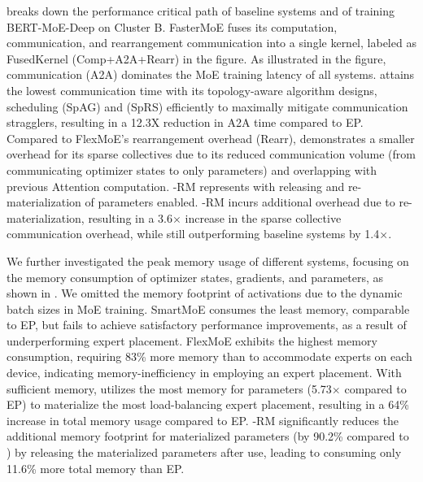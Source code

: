 

 breaks down the performance critical path of baseline systems and \xxx of training BERT-MoE-Deep on Cluster B.
FasterMoE fuses its computation, \collatoa communication, and rearrangement communication into a single kernel, labeled as FusedKernel (Comp+A2A+Rearr) in the figure.
As illustrated in the figure, \collatoa communication (A2A) dominates the MoE training latency of all systems.
\xxx attains the lowest \collatoa communication time with its topology-aware algorithm designs, scheduling \collsag (SpAG) and \collsrs (SpRS) efficiently to maximally mitigate communication stragglers, resulting in a 12.3X reduction in A2A time compared to EP.
Compared to FlexMoE's rearrangement overhead (Rearr), \xxx demonstrates a smaller overhead for its sparse collectives due to its reduced communication volume (from communicating optimizer states to only parameters) and overlapping with previous Attention computation.
\xxx-RM represents \xxx with releasing and re-materialization of parameters enabled.
\xxx-RM incurs additional overhead due to re-materialization, resulting in a 3.6$\times$ increase in the sparse collective communication overhead, while still outperforming baseline systems by 1.4$\times$.










We further investigated the peak memory usage of different systems, focusing on the memory consumption of optimizer states, gradients, and parameters, as shown in .
We omitted the memory footprint of activations due to the dynamic batch sizes in MoE training.
SmartMoE consumes the least memory, comparable to EP, but fails to achieve satisfactory performance improvements, as a result of underperforming expert placement.
FlexMoE exhibits the highest memory consumption, requiring 83\% more memory than \xxx to accommodate experts on each device, indicating memory-inefficiency in employing an expert placement.
With sufficient memory, \xxx utilizes the most memory for parameters (5.73$\times$ compared to EP) to materialize the most load-balancing expert placement, resulting in a 64\% increase in total memory usage compared to EP.
\xxx-RM significantly reduces the additional memory footprint for materialized parameters (by 90.2\% compared to \xxx) by releasing the materialized parameters after use, leading to consuming only 11.6\% more total memory than EP.








